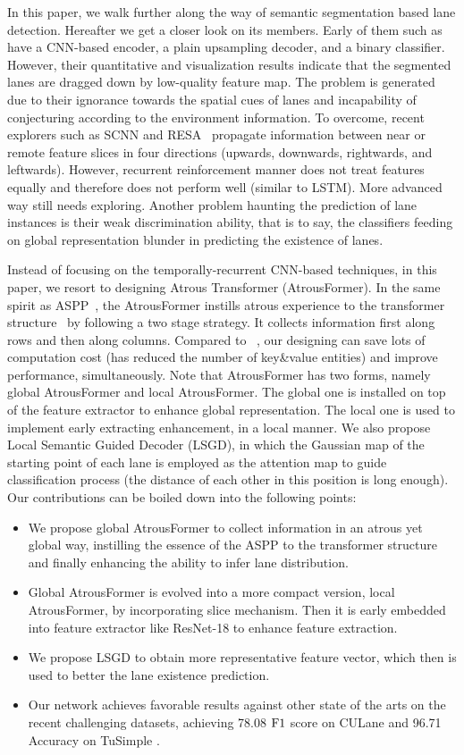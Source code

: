 \documentclass[preprint,12pt,review]{elsarticle}
\begin{document}
In this paper, we walk further along the way of semantic segmentation based lane detection. Hereafter we get a closer look on its members. Early of them such as \cite{erfnet,rbnet,gan,liulane} have a CNN-based encoder, a plain upsampling decoder, and a binary classifier. However, their quantitative and visualization results indicate that the segmented lanes are dragged down by low-quality feature map. The problem is generated due to their ignorance towards the spatial cues of lanes and incapability of conjecturing according to the environment information. To overcome, recent explorers such as SCNN \cite{
SCNN} and RESA~\cite{resa} propagate information between near or remote feature slices in four directions (upwards, downwards, rightwards, and leftwards). However, recurrent reinforcement manner does not treat features equally and therefore does not perform well (similar to LSTM). More advanced way still needs exploring. Another problem haunting the prediction of lane instances is their weak discrimination ability, that is to say, the classifiers feeding on global representation blunder in predicting the existence of lanes.

Instead of focusing on the temporally-recurrent CNN-based techniques, in this paper, we resort to designing Atrous Transformer (AtrousFormer). In the same spirit as ASPP~\cite{aspp}, the AtrousFormer instills atrous experience to the transformer structure~\cite{transformer} by following a two stage strategy. It collects information first along rows and then along columns. Compared to ~\cite{transformer}, our designing can save lots of computation cost (has reduced the number of key\&value entities) and improve performance, simultaneously. Note that AtrousFormer has  two forms, namely global AtrousFormer and local AtrousFormer. The global one is installed on top of the feature extractor to enhance global representation. The local one is used to implement early extracting enhancement, in a local manner. We also propose Local Semantic  Guided  Decoder (LSGD), in which the Gaussian map of the starting point of each lane is employed as the attention map to guide classification process (the distance of each other in this position is long enough). Our contributions can be boiled down into the following points: 


\begin{itemize}
	\item We propose global AtrousFormer to collect information in an atrous yet global way, instilling the essence of the ASPP to the transformer structure and finally enhancing the ability to infer lane distribution. 
	\item Global AtrousFormer is evolved into a more compact version, local AtrousFormer, by incorporating slice mechanism. Then it is early embedded into feature extractor like ResNet-18 to enhance feature extraction.
	\item We propose LSGD to obtain more representative feature vector, which then is used to better the lane existence prediction. 
	\item Our network achieves favorable results against other state of the arts on the recent challenging datasets, achieving 78.08 $\rm F1$ score on CULane \cite{SCNN} and 96.71 Accuracy on TuSimple \cite{tusimple}.
\end{itemize}
\end{document}
